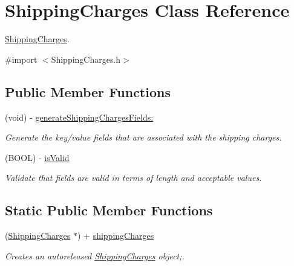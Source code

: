 \hypertarget{interface_shipping_charges}{
\section{ShippingCharges Class Reference}
\label{interface_shipping_charges}
}


\hyperlink{interface_shipping_charges}{ShippingCharges}.  




{\ttfamily \#import $<$ShippingCharges.h$>$}

\subsection*{Public Member Functions}
\begin{DoxyCompactItemize}
\item 
(void) -\/ \hyperlink{interface_shipping_charges_a212ce5ba856b42e7cbc2e8406490b455}{generateShippingChargesFields:}
\begin{DoxyCompactList}\small\item\em Generate the key/value fields that are associated with the shipping charges. \item\end{DoxyCompactList}\item 
(BOOL) -\/ \hyperlink{interface_shipping_charges_aecfee25e5f6be36343b053d3a772bb15}{isValid}
\begin{DoxyCompactList}\small\item\em Validate that fields are valid in terms of length and acceptable values. \item\end{DoxyCompactList}\end{DoxyCompactItemize}
\subsection*{Static Public Member Functions}
\begin{DoxyCompactItemize}
\item 
(\hyperlink{interface_shipping_charges}{ShippingCharges} $\ast$) + \hyperlink{interface_shipping_charges_af582b223677096ca9c0772f8e719aa43}{shippingCharges}
\begin{DoxyCompactList}\small\item\em Creates an autoreleased \hyperlink{interface_shipping_charges}{ShippingCharges} object;. \item\end{DoxyCompactList}\end{DoxyCompactItemize}

